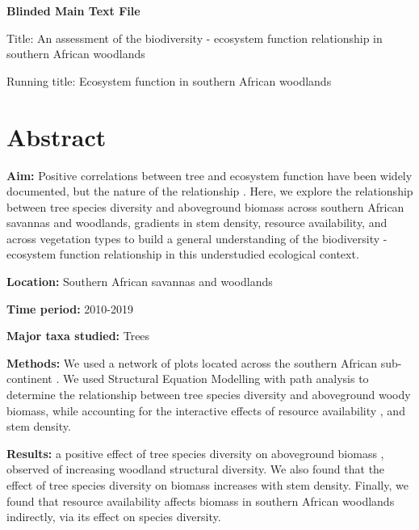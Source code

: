 \documentclass[11pt,a4paper]{article}
\begin{document}
\newpage{}

{\LARGE{\textbf{Blinded Main Text File}}}

\LARGE{Title: An assessment of the biodiversity - ecosystem function relationship in southern African woodlands}

\normalsize{Running title: Ecosystem function in southern African woodlands}

\section{Abstract}

\textbf{Aim:} Positive correlations between tree  and ecosystem function have been widely documented, but the nature of the relationship .  Here, we explore the relationship between tree species diversity and aboveground biomass across southern African savannas and woodlands,  gradients in stem density, resource availability, and across vegetation types to build a general understanding of the biodiversity - ecosystem function relationship in this understudied ecological context.

\textbf{Location:} Southern African savannas and woodlands

\textbf{Time period:} 2010-2019

\textbf{Major taxa studied:} Trees

\textbf{Methods:} We used a network of \nplots{}  plots located across the southern African sub-continent . We used Structural Equation Modelling with path analysis to determine the relationship between tree species diversity and aboveground woody biomass, while accounting for the interactive effects of resource availability , and stem density.

\textbf{Results:}  a positive effect of tree species diversity on aboveground biomass , observed  of increasing woodland structural diversity. We also found that the effect of tree species diversity on biomass increases with stem density. Finally, we found that resource availability affects biomass in southern African woodlands  indirectly, via its effect on species diversity.
\end{document}
